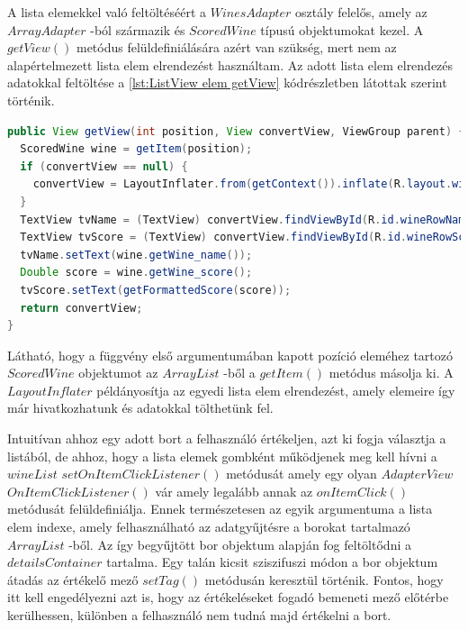 \documentclass[12pt]{report}
\theoremstyle{definition}
\begin{document}
	A lista elemekkel való feltöltéséért a $WinesAdapter$ osztály felelős, amely az \linebreak$ArrayAdapter$ -ból származik és $ScoredWine$ típusú objektumokat kezel. A $getView\left(\right)$ metódus felüldefiniálására azért van szükség, mert nem az alapértelmezett lista elem elrendezést használtam. Az adott lista elem elrendezés adatokkal feltöltése a \ref{lst:ListView elem getView} kódrészletben látottak szerint történik.
	
	\noindent\begin{minipage}{\linewidth}
		\begin{lstlisting}[language=java,label={lst:ListView elem getView}, caption={Lista elem tartalmma való feltöltése}]
public View getView(int position, View convertView, ViewGroup parent) {
  ScoredWine wine = getItem(position);
  if (convertView == null) {
    convertView = LayoutInflater.from(getContext()).inflate(R.layout.winerow, parent, false);
  }   
  TextView tvName = (TextView) convertView.findViewById(R.id.wineRowName);
  TextView tvScore = (TextView) convertView.findViewById(R.id.wineRowScore);  
  tvName.setText(wine.getWine_name());
  Double score = wine.getWine_score();
  tvScore.setText(getFormattedScore(score));  
  return convertView;
}
		\end{lstlisting}
	\end{minipage}
	
	Látható, hogy a függvény első argumentumában kapott pozíció eleméhez tartozó \linebreak$ScoredWine$ objektumot az $ArrayList$ -ből a $getItem\left(\right)$ metódus másolja ki. A \linebreak$LayoutInflater$ példányosítja az egyedi lista elem elrendezést, amely elemeire így már hivatkozhatunk és adatokkal tölthetünk fel.
	
	Intuitívan ahhoz egy adott bort a felhasználó értékeljen, azt ki fogja választja a listából, de ahhoz, hogy a lista elemek gombként működjenek meg kell hívni a $wineList$ $setOnItemClickListener\left(\right)$ metódusát amely egy olyan $AdapterView$ \linebreak$OnItemClickListener\left(\right)$ vár amely legalább annak az $onItemClick\left(\right)$ metódusát felüldefiniálja. Ennek természetesen az egyik argumentuma a lista elem indexe, amely felhasználható az adatgyűjtésre a borokat tartalmazó $ArrayList$ -ből. Az így begyűjtött bor 
	objektum alapján fog feltöltődni a $detailsContainer$ tartalma. Egy talán kicsit sziszifuszi módon a bor objektum átadás az értékelő mező $setTag\left(\right)$ metódusán keresztül történik. Fontos, hogy itt kell engedélyezni azt is, hogy az értékeléseket fogadó bemeneti mező előtérbe kerülhessen, különben a felhasználó nem tudná majd értékelni a bort.
	
\end{document}
